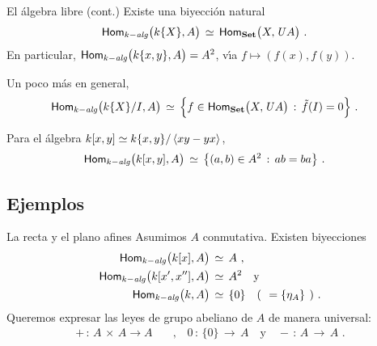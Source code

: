 \begin{frame}{El \'{a}lgebra libre (cont.)}
	Existe una biyecci\'{o}n natural
	\begin{align*}
		\Homalg\big(k\{X\},A\big) & \,\simeq\,
			\Hom[\Set]\big(X,\olvido A\big)
		\text{ .}
	\end{align*}
	En particular,
	\begin{math}
		\Homalg\big(k\{x,y\},A\big)=A^2
	\end{math}, v\'{\i}a $f\mapsto (f(x),f(y))$.

	Un poco m\'{a}s en general,
	\begin{align*}
		\Homalg\big(k\{X\}/I,A\big) & \,\simeq\,
			\Big\{f\in\Hom[\Set]\big(X,\olvido A\big)\,:\,
				\tilde f(I)=0\Big\}
		\text{ .}
	\end{align*}
	\begin{ejemploCocienteDeLibre}\label{ejemplo:cocientedelibre}
		Para el \'{a}lgebra $k[x,y]\simeq k\{x,y\}/\generado{xy-yx}$,
		\begin{align*}
			\Homalg\big(k[x,y],A\big) & \,\simeq\,
				\big\{(a,b)\in A^2\,:\,ab=ba\big\}
			\text{ .}
		\end{align*}
	\end{ejemploCocienteDeLibre}
\end{frame}

\subsection{Ejemplos}

\begin{frame}{La recta y el plano afines}
	Asumimos $A$ conmutativa. Existen biyecciones
	\begin{align*}
		\Homalg\big(k[x],A\big) & \,\simeq\,A \text{ ,} \\
		\Homalg\big(k[x',x''],A\big) & \,\simeq\,A^2 \quad\text{y} \\
		\Homalg\big(k,A\big) & \,\simeq\,\{0\} \quad
			\text{(\phantom)}=\{\eta_A\}\text{\phantom()}
		\text{ .}
	\end{align*}
	Queremos expresar las leyes de grupo abeliano de $A$ de manera
	universal:
	\begin{align*}
		+ \,:\,A\,\times\,A\rightarrow A & \quad\text{,}\quad
		0 \,:\,\{0\}\,\rightarrow\,A \quad\text{y}\quad
		- \,:\,A\,\rightarrow\,A
		\text{ .}
	\end{align*}
\end{frame}

